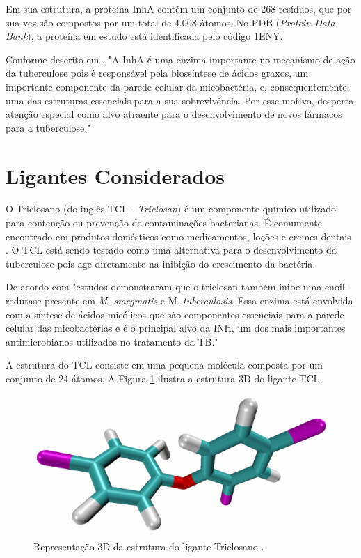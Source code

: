 Em sua estrutura, a proteína InhA contém um conjunto de 268 resíduos, que por sua vez são compostos por um total de 4.008 átomos. No PDB (\emph{Protein Data Bank}), a proteína em estudo está identificada pelo código 1ENY.

Conforme descrito em \cite{kar11}, "A InhA é uma enzima importante no mecanismo de ação da tuberculose pois é responsável pela biossíntese de ácidos graxos, um importante componente da parede celular da micobactéria, e, consequentemente, uma das estruturas essenciais para a sua sobrevivência. Por esse motivo, desperta atenção especial como alvo atraente para o desenvolvimento de novos fármacos para a tuberculose."

\section{Ligantes Considerados}

O Triclosano (do inglês TCL - \emph{Triclosan}) é um componente químico utilizado para contenção ou prevenção de contaminações bacterianas. É comumente encontrado em produtos domésticos como medicamentos, loções e cremes dentais \cite{TCL}. O TCL está sendo testado como uma alternativa para o desenvolvimento da tuberculose pois age diretamente na inibição do crescimento da bactéria.

De acordo com \cite{GAU08} "estudos demonstraram que o triclosan também inibe uma enoil-redutase presente em \emph{M. smegmatis} e M. \emph{tuberculosis}. Essa enzima está envolvida com a síntese de ácidos micólicos que são componentes essenciais para a parede celular das  micobactérias e é o principal alvo da INH, um dos mais importantes antimicrobianos utilizados no tratamento da TB."

A estrutura do TCL consiste em uma pequena molécula composta por um conjunto de 24 átomos. A Figura \ref{fig:tcl} ilustra a estrutura 3D do ligante TCL.

\begin{figure}[h]
	\center
	\includegraphics[width=12.5cm]{images/tcl.png}
	\caption{Representação 3D da estrutura do ligante Triclosano \cite{kar11}.}
	\label{fig:tcl}
\end{figure}

